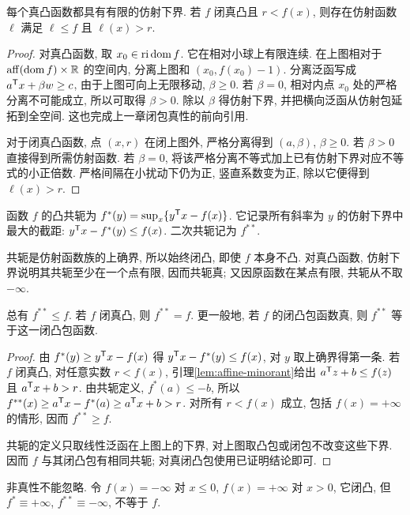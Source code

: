 \begin{lemma}\label{lem:affine-minorant}
每个真凸函数都具有有限的仿射下界. 若 $f$ 闭真凸且 $r<f(x)$, 则存在仿射函数 $\ell$ 满足 $\ell\le f$ 且 $\ell(x)>r$.
\end{lemma}
\begin{proof}
对真凸函数, 取 $x_0\in\operatorname{ri}\operatorname{dom} f$. 它在相对小球上有限连续. 在上图相对于 $\operatorname{aff}(\operatorname{dom} f)\times\mathbb R$ 的空间内, 分离上图和 $(x_0,f(x_0)-1)$. 分离泛函写成 $a^{\mathsf T} x+\beta w\ge c$, 由于上图可向上无限移动, $\beta\ge0$. 若 $\beta=0$, 相对内点 $x_0$ 处的严格分离不可能成立, 所以可取得 $\beta>0$. 除以 $\beta$ 得仿射下界, 并把横向泛函从仿射包延拓到全空间. 这也完成上一章闭包真性的前向引用.

对于闭真凸函数, 点 $(x,r)$ 在闭上图外, 严格分离得到 $(a,\beta)$, $\beta\ge0$. 若 $\beta>0$ 直接得到所需仿射函数. 若 $\beta=0$, 将该严格分离不等式加上已有仿射下界对应不等式的小正倍数. 严格间隔在小扰动下仍为正, 竖直系数变为正, 除以它便得到 $\ell(x)>r$.
\end{proof}
\begin{definition}
函数 $f$ 的凸共轭为 $f^*(y)=\sup_x\{y^{\mathsf T} x-f(x)\}$. 它记录所有斜率为 $y$ 的仿射下界中最大的截距: $y^{\mathsf T} x-f^*(y)\le f(x)$. 二次共轭记为 $f^{**}$.
\end{definition}
共轭是仿射函数族的上确界, 所以始终闭凸, 即使 $f$ 本身不凸. 对真凸函数, 仿射下界说明其共轭至少在一个点有限, 因而共轭真; 又因原函数在某点有限, 共轭从不取 $-\infty$.

\begin{theorem}[共轭定理]\label{thm:biconjugate}
总有 $f^{**}\le f$. 若 $f$ 闭真凸, 则 $f^{**}=f$. 更一般地, 若 $f$ 的闭凸包函数真, 则 $f^{**}$ 等于这一闭凸包函数.
\end{theorem}
\begin{proof}
由 $f^*(y)\ge y^{\mathsf T} x-f(x)$ 得 $y^{\mathsf T} x-f^*(y)\le f(x)$, 对 $y$ 取上确界得第一条. 若 $f$ 闭真凸, 对任意实数 $r<f(x)$, 引理\ref{lem:affine-minorant}给出 $a^{\mathsf T} z+b\le f(z)$ 且 $a^{\mathsf T} x+b>r$. 由共轭定义, $f^*(a)\le-b$, 所以 $f^{**}(x)\ge a^{\mathsf T} x-f^*(a)\ge a^{\mathsf T} x+b>r$. 对所有 $r<f(x)$ 成立, 包括 $f(x)=+\infty$ 的情形, 因而 $f^{**}\ge f$.

共轭的定义只取线性泛函在上图上的下界, 对上图取凸包或闭包不改变这些下界. 因而 $f$ 与其闭凸包有相同共轭; 对真闭凸包使用已证明结论即可.
\end{proof}
非真性不能忽略. 令 $f(x)=-\infty$ 对 $x\le0$, $f(x)=+\infty$ 对 $x>0$, 它闭凸, 但 $f^*\equiv+\infty$, $f^{**}\equiv-\infty$, 不等于 $f$.

